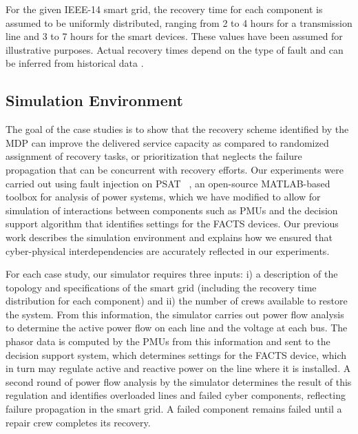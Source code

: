 \documentclass[runningheads]{llncs}
\begin{document}
For the given IEEE-14 smart grid, the recovery time for each component is assumed to be uniformly distributed, ranging from 2 to 4 hours for a transmission line and 3 to 7 hours for the smart devices. These values have been assumed for illustrative purposes. Actual recovery times depend on the type of fault and can be inferred from historical data \cite{Vad17}. 



\subsection{Simulation Environment}

The goal of the case studies is to show that the recovery scheme identified by the MDP can improve the delivered service capacity as compared to randomized assignment of recovery tasks, or prioritization that neglects the failure propagation that can be concurrent with recovery efforts. Our experiments were carried out using fault injection on PSAT ~\cite{psat_2005}, an open-source MATLAB-based toolbox for analysis of power systems, which we have modified to allow for simulation of interactions between components such as PMUs and the decision support algorithm that identifies settings for the FACTS devices. Our previous work \cite{MaS17c, marashi_identification_2021}  describes the simulation environment and explains how we ensured that cyber-physical interdependencies are accurately reflected in our experiments. 

For each case study, our simulator requires three inputs: i) a description of the topology and specifications of the smart grid (including the recovery time distribution for each component) and 
ii) the number of crews available to restore the system. From this information, the simulator carries out power flow analysis to determine the active power flow on each line and the voltage at each bus. The phasor data is computed by the PMUs from this information and sent to the decision support system, which determines settings for the FACTS device, which in turn may regulate active and reactive power on the line where it is installed. A second round of power flow analysis by the simulator determines the result of this regulation and identifies overloaded lines and failed cyber components, reflecting failure propagation in the smart grid. A failed component remains failed until a repair crew completes its recovery. 
\end{document}
